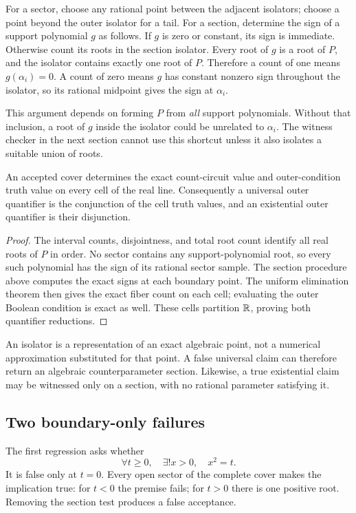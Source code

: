 For a sector, choose any rational point between the adjacent isolators; choose a point beyond the outer isolator for a tail. For a section, determine the sign of a support polynomial $g$ as follows. If $g$ is zero or constant, its sign is immediate. Otherwise count its roots in the section isolator. Every root of $g$ is a root of $P$, and the isolator contains exactly one root of $P$. Therefore a count of one means $g(\alpha_i)=0$. A count of zero means $g$ has constant nonzero sign throughout the isolator, so its rational midpoint gives the sign at $\alpha_i$.

This argument depends on forming $P$ from \emph{all} support polynomials. Without that inclusion, a root of $g$ inside the isolator could be unrelated to $\alpha_i$. The witness checker in the next section cannot use this shortcut unless it also isolates a suitable union of roots.

\begin{theorem}\label{thm:outer}
An accepted cover determines the exact count-circuit value and outer-condition truth value on every cell of the real line. Consequently a universal outer quantifier is the conjunction of the cell truth values, and an existential outer quantifier is their disjunction.
\end{theorem}
\begin{proof}
The interval counts, disjointness, and total root count identify all real roots of $P$ in order. No sector contains any support-polynomial root, so every such polynomial has the sign of its rational sector sample. The section procedure above computes the exact signs at each boundary point. The uniform elimination theorem then gives the exact fiber count on each cell; evaluating the outer Boolean condition is exact as well. These cells partition $\mathbb R$, proving both quantifier reductions.
\end{proof}

An isolator is a representation of an exact algebraic point, not a numerical approximation substituted for that point. A false universal claim can therefore return an algebraic counterparameter section. Likewise, a true existential claim may be witnessed only on a section, with no rational parameter satisfying it.

\subsection{Two boundary-only failures}

The first regression asks whether
\[
\forall t\geq0,\quad \exists!x>0,\quad x^2=t.
\]
It is false only at $t=0$. Every open sector of the complete cover makes the implication true: for $t<0$ the premise fails; for $t>0$ there is one positive root. Removing the section test produces a false acceptance.

